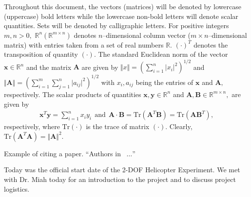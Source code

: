 \documentclass[fontsize=11pt, %
                             paper=letter, %
                             twoside, %
                             captions=tableheading,
                             index=totoc,
                             hyperref]{labbook}
\begin{document}
\begin{addmargin}[0cm]{0cm} %

\pagestyle{scrheadings} %



Throughout this document, the vectors (matrices) will be denoted by lowercase (uppercase) bold letters while the lowercase non-bold letters will denote scalar quantities. Sets will be denoted by calligraphic letters. For positive integers $m,n>0,$ $\mathbb{R}^n(\mathbb{R}^{m\times n})$ denotes $n$--dimensional column vector ($m\times n$--dimensional matrix) with entries taken from a set of real numbers $\mathbb{R}.$ $(\cdot)^T$ denotes the transposition of quantity $(\cdot).$ The standard Euclidean norm of the vector  $\mathbf{x}\in\mathbb{R}^n$ and the matrix $\mathbf{A}$ are given by $\Vert x \Vert = \left(\sum_{i=1}^n\lvert x_i\rvert^2\right)^{1/2}$ and $\Vert \mathbf{A} \Vert = \left(\sum_{i=1}^m\sum_{j=1}^n\lvert a_{ij}\rvert^2\right)^{1/2}$  with $x_i,a_{ij}$ being the entries of $\mathbf{x}$ and $\mathbf{A},$ respectively. The scalar products of quantities $\mathbf{x},
\mathbf{y}\in\mathbb{R}^n$ and $\mathbf{A}, \mathbf{B}\in\mathbb{R}^{m\times n},$ are given by %
%
\begin{align*}
  \mathbf{x}^T\mathbf{y} = \sum_{i=1}^nx_iy_i~~\mathrm{and}~~\mathbf{A}\cdot \mathbf{B} =\mathrm{Tr}\left(\mathbf{A}^T\mathbf{B}\right) = \mathrm{Tr}\left(\mathbf{A}\mathbf{B}^T\right),
\end{align*}
%
respectively, where $\mathrm{Tr}(\cdot)$ is the trace of matrix $(\cdot).$ Clearly, $\mathrm{Tr}(\mathbf{A}^T\mathbf{A}) = \Vert \mathbf{A}\Vert^2.$ %
%

Example of citing a paper. ``Authors in~\cite{Martinelli2015-Robot} $\ldots$''


Today was the official start date of the 2-DOF Helicopter Experiment. We met with Dr. Miah today for an introduction to the project and to discuss project logistics.


\end{addmargin}
\end{document}
